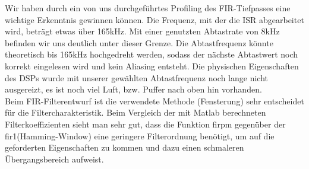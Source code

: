 \noindent Wir haben durch ein von uns durchgeführtes Profiling des FIR-Tiefpasses eine wichtige Erkenntnis gewinnen können. Die Frequenz, mit der die ISR abgearbeitet wird, beträgt etwas über 165kHz. Mit einer genutzten Abtastrate von 8kHz befinden wir uns deutlich unter dieser Grenze. Die Abtastfrequenz könnte theoretisch bis 165kHz hochgedreht werden, sodass der nächste Abtastwert noch korrekt eingelesen wird und kein Aliasing entsteht. Die physischen Eigenschaften des DSPs wurde mit unserer gewählten Abtastfrequenz noch lange nicht ausgereizt, es ist noch viel Luft, bzw. Puffer nach oben hin vorhanden.\\
\noindent Beim FIR-Filterentwurf ist die verwendete Methode (Fensterung) sehr entscheidet für die Filtercharakteristik. Beim Vergleich der mit Matlab berechneten Filterkoeffizienten sieht man sehr gut, dass die Funktion firpm gegenüber der fir1(Hamming-Window) eine geringere Filterordnung benötigt, um auf die geforderten Eigenschaften zu kommen und dazu einen schmaleren Übergangsbereich aufweist.